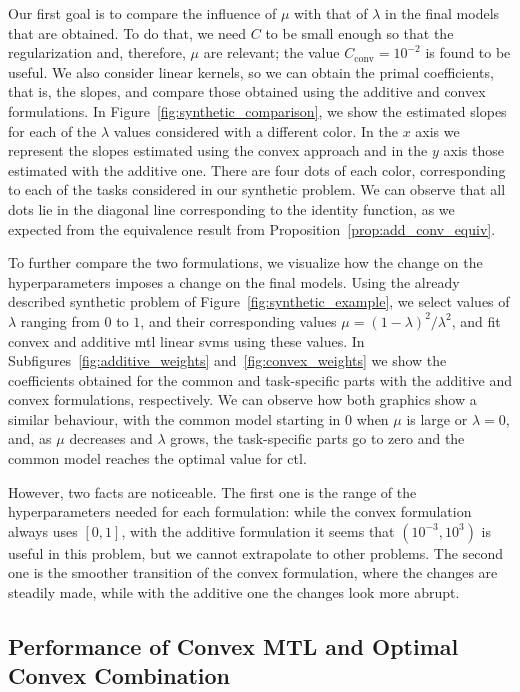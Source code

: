 Our first goal is to compare the influence of $\mu$ with that of $\lambda$ in the final models that are obtained. To do that, we need $C$ to be small enough so that the regularization and, therefore, $\mu$ are relevant; the value $C_{\text{conv}} = 10^{-2}$ is found to be useful. We also consider linear kernels, so we can obtain the primal coefficients, that is, the slopes, and compare those obtained using the additive and convex formulations. In Figure~\ref{fig:synthetic_comparison}, we show the estimated slopes for each of the $\lambda$ values considered with a different color. In the $x$ axis we represent the slopes estimated using the convex approach and in the $y$ axis those estimated with the additive one. There are four dots of each color, corresponding to each of the tasks considered in our synthetic problem. We can observe that all dots lie in the diagonal line corresponding to the identity function, as we expected from the equivalence result from Proposition~\ref{prop:add_conv_equiv}.

%
To further compare the two formulations, we visualize how the change on the hyperparameters imposes a change on the final models. Using the already described synthetic problem of Figure~\ref{fig:synthetic_example}, we select values of $\lambda$ ranging from $0$ to $1$, and their corresponding values $\mu = (1-\lambda)^2 / \lambda^2$, and fit convex and additive \acrshort{mtl} linear \acrshort{svm}s using these values. In Subfigures~\ref{fig:additive_weights} and~\ref{fig:convex_weights} we show the coefficients obtained for the common and task-specific parts with the additive and convex formulations, respectively.
%
We can observe how both graphics show a similar behaviour, with the common model starting in $0$ when $\mu$ is large or $\lambda=0$, and, as $\mu$ decreases and $\lambda$ grows, the task-specific parts go to zero and the common model reaches the optimal value for \acrshort{ctl}.
%

However, two facts are noticeable. The first one is the range of the hyperparameters needed for each formulation: while the convex formulation always uses $[0, 1]$, with the additive formulation it seems that $(10^{-3}, 10^3)$ is useful in this problem, but we cannot extrapolate to other problems. The second one is the smoother transition of the convex formulation, where the changes are steadily made, while with the additive one the changes look more abrupt.



\subsection{Performance of Convex MTL and Optimal Convex Combination}

